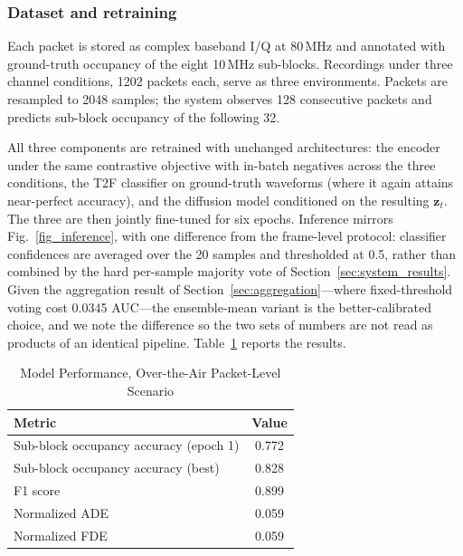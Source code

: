 \documentclass[lettersize,journal]{IEEEtran}
\begin{document}
\subsubsection{\textbf{Dataset and retraining}}
Each packet is stored as complex baseband I/Q at 80\,MHz and annotated with
ground-truth occupancy of the eight 10\,MHz sub-blocks. Recordings under three
channel conditions, 1202 packets each, serve as three environments. Packets are
resampled to 2048 samples; the system observes 128 consecutive packets and
predicts sub-block occupancy of the following 32.

All three components are retrained with unchanged architectures: the encoder
under the same contrastive objective with in-batch negatives across the three
conditions, the T2F classifier on ground-truth waveforms (where it again attains
near-perfect accuracy), and the diffusion model conditioned on the resulting
$\mathbf{z}_t$. The three are then jointly fine-tuned for six epochs. Inference
mirrors Fig.~\ref{fig_inference}, with one difference from the frame-level
protocol: classifier confidences are averaged over the 20 samples and
thresholded at 0.5, rather than combined by the hard per-sample majority vote of
Section~\ref{sec:system_results}. Given the aggregation result of
Section~\ref{sec:aggregation}---where fixed-threshold voting cost 0.0345
AUC---the ensemble-mean variant is the better-calibrated choice, and we note the
difference so the two sets of numbers are not read as products of an identical
pipeline. Table~\ref{tab:ota} reports the results.

\begin{table}[!t]
\centering
\caption{Model Performance, Over-the-Air Packet-Level Scenario}
\label{tab:ota}
\renewcommand{\arraystretch}{1.2}
\begin{tabular}{@{}lc@{}}
\toprule
\textbf{Metric} & \textbf{Value} \\
\midrule
Sub-block occupancy accuracy (epoch 1) & 0.772 \\
Sub-block occupancy accuracy (best)    & 0.828 \\
F1 score                               & 0.899 \\
Normalized ADE                         & 0.059 \\
Normalized FDE                         & 0.059 \\
\bottomrule
\end{tabular}
\end{table}
\end{document}
